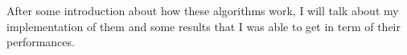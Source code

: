 After some introduction about how these algorithms work, I will talk about my implementation of them and some results that I was able to get in term of their performances.






